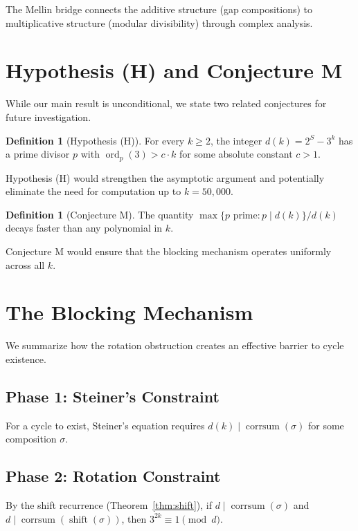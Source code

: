 \documentclass[12pt,a4paper]{amsart}
\theoremstyle{plain}
\theoremstyle{definition}
\newtheorem{definition}[theorem]{Definition}
\newcommand{\corrsum}{\operatorname{corrsum}}
\newcommand{\shift}{\operatorname{shift}}
\newcommand{\ord}{\operatorname{ord}}
\begin{document}
The Mellin bridge connects the additive structure (gap compositions) to multiplicative structure (modular divisibility) through complex analysis.

\section{Hypothesis (H) and Conjecture M}
\label{sec:conjecture}

While our main result is unconditional, we state two related conjectures for future investigation.

\begin{definition}[Hypothesis (H)]
For every $k \geq 2$, the integer $d(k) = 2^S - 3^k$ has a prime divisor $p$ with $\ord_p(3) > c \cdot k$ for some absolute constant $c > 1$.
\end{definition}

Hypothesis (H) would strengthen the asymptotic argument and potentially eliminate the need for computation up to $k = 50{,}000$.

\begin{definition}[Conjecture M]
The quantity $\max\{p \text{ prime} : p \mid d(k)\} / d(k)$ decays faster than any polynomial in $k$.
\end{definition}

Conjecture M would ensure that the blocking mechanism operates uniformly across all $k$.

\section{The Blocking Mechanism}
\label{sec:blocking}

We summarize how the rotation obstruction creates an effective barrier to cycle existence.

\subsection{Phase 1: Steiner's Constraint}

For a cycle to exist, Steiner's equation requires $d(k) \mid \corrsum(\sigma)$ for some composition $\sigma$.

\subsection{Phase 2: Rotation Constraint}

By the shift recurrence (Theorem~\ref{thm:shift}), if $d \mid \corrsum(\sigma)$ and $d \mid \corrsum(\shift(\sigma))$, then $3^{2k} \equiv 1 \pmod{d}$.
\end{document}
